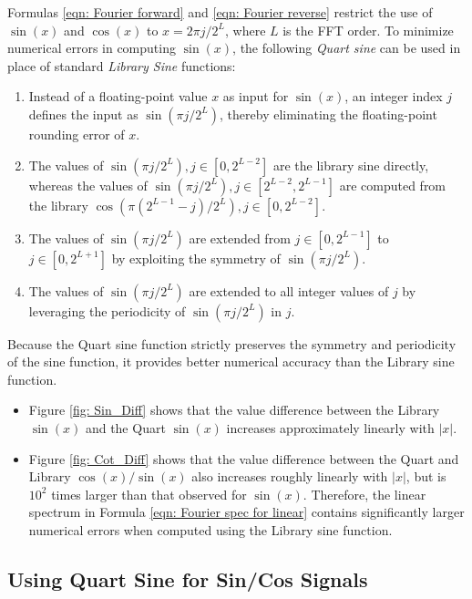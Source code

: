 \documentclass[twoside]{article}
\numberwithin{equation}{section}
\begin{document}
Formulas \eqref{eqn: Fourier forward} and \eqref{eqn: Fourier reverse} restrict the use of $\sin(x)$ and $\cos(x)$ to $x = 2\pi j /2^L$, where $L$ is the FFT order.
To minimize numerical errors in computing $\sin(x)$, the following \emph{Quart sine} can be used in place of standard \emph{Library Sine} functions:
\begin{enumerate}
\item Instead of a floating-point value $x$ as input for $\sin(x)$, an integer index $j$ defines the input as $\sin(\pi j/2^L)$, thereby eliminating the floating-point rounding error of $x$.

\item The values of $\sin(\pi j/2^L), j \in [0, 2^{L-2}]$ are the library sine directly, whereas the values of $\sin(\pi j/2^L), j \in [2^{L-2}, 2^{L-1}]$ are computed from the library $\cos(\pi (2^{L - 1} - j)/2^L), j \in [0, 2^{L-2}]$.

\item The values of $\sin(\pi j/2^L)$ are extended from $j \in [0, 2^{L-1}]$ to $j \in [0, 2^{L + 1}]$ by exploiting the symmetry of $\sin(\pi j/2^L)$.

\item The values of $\sin(\pi j/2^L)$ are extended to all integer values of $j$ by leveraging the periodicity of $\sin(\pi j/2^L)$ in $j$.

\end{enumerate}
Because the Quart sine function strictly preserves the symmetry and periodicity of the sine function, it provides better numerical accuracy than the Library sine function.
\begin{itemize}
\item Figure \ref{fig: Sin_Diff} shows that the value difference between the Library $\sin(x)$ and the Quart $\sin(x)$ increases approximately linearly with $|x|$.

\item Figure \ref{fig: Cot_Diff} shows that the value difference between the Quart and Library $\cos(x)/\sin(x)$ also increases roughly linearly with $|x|$, but is $10^2$ times larger than that observed for $\sin(x)$.
Therefore, the linear spectrum in Formula \eqref{eqn: Fourier spec for linear} contains significantly larger numerical errors when computed using the Library sine function.

\end{itemize}


\subsection{Using Quart Sine for Sin/Cos Signals}
\end{document}
